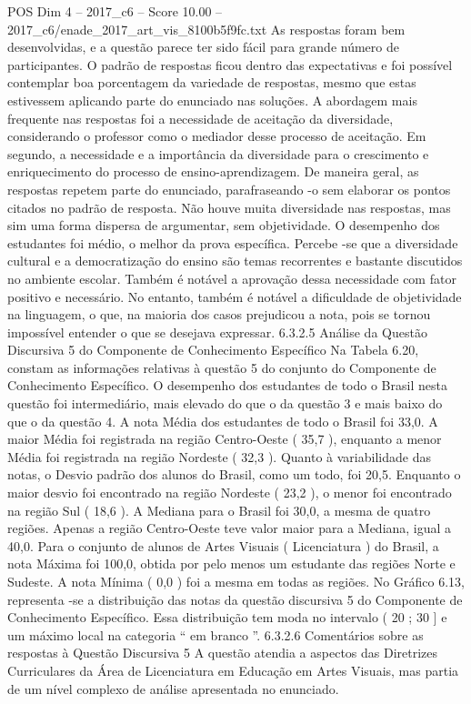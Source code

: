 \begin{textsample}{POS Dim 4 – 2017\_c6 – Score 10.00 – 2017\_c6/enade\_2017\_art\_vis\_8100b5f9fc.txt}
As respostas foram bem desenvolvidas, e a questão parece ter sido fácil para grande número de participantes.
O padrão de respostas ficou dentro das expectativas e foi possível contemplar boa porcentagem da variedade de respostas, mesmo que estas estivessem aplicando parte do enunciado nas soluções.
A abordagem mais frequente nas respostas foi a necessidade de aceitação da diversidade, considerando o professor como o mediador desse processo de aceitação.
Em segundo, a necessidade e a importância da diversidade para o crescimento e enriquecimento do processo de ensino-aprendizagem.
De maneira geral, as respostas repetem parte do enunciado, parafraseando -o sem elaborar os pontos citados no padrão de resposta.
Não houve muita diversidade nas respostas, mas sim uma forma dispersa de argumentar, sem objetividade.
O desempenho dos estudantes foi médio, o melhor da prova específica.
Percebe -se que a diversidade cultural e a democratização do ensino são temas recorrentes e bastante discutidos no ambiente escolar.
Também é notável a aprovação dessa necessidade com fator positivo e necessário.
No entanto, também é notável a dificuldade de objetividade na linguagem, o que, na maioria dos casos prejudicou a nota, pois se tornou impossível entender o que se desejava expressar. 6.3.2.5 Análise da Questão Discursiva 5 do Componente de Conhecimento Específico Na Tabela 6.20, constam as informações relativas à questão 5 do conjunto do Componente de Conhecimento Específico.
O desempenho dos estudantes de todo o Brasil nesta questão foi intermediário, mais elevado do que o da questão 3 e mais baixo do que o da questão 4.
A nota Média dos estudantes de todo o Brasil foi 33,0.
A maior Média foi registrada na região Centro-Oeste ( 35,7 ), enquanto a menor Média foi registrada na região Nordeste ( 32,3 ).
Quanto à variabilidade das notas, o Desvio padrão dos alunos do Brasil, como um todo, foi 20,5.
Enquanto o maior desvio foi encontrado na região Nordeste ( 23,2 ), o menor foi encontrado na região Sul ( 18,6 ).
A Mediana para o Brasil foi 30,0, a mesma de quatro regiões.
Apenas a região Centro-Oeste teve valor maior para a Mediana, igual a 40,0.
Para o conjunto de alunos de Artes Visuais ( Licenciatura ) do Brasil, a nota Máxima foi 100,0, obtida por pelo menos um estudante das regiões Norte e Sudeste.
A nota Mínima ( 0,0 ) foi a mesma em todas as regiões.
No Gráfico 6.13, representa -se a distribuição das notas da questão discursiva 5 do Componente de Conhecimento Específico.
Essa distribuição tem moda no intervalo ( 20 ; 30 ] e um máximo local na categoria “ em branco ”. 6.3.2.6 Comentários sobre as respostas à Questão Discursiva 5 A questão atendia a aspectos das Diretrizes Curriculares da Área de Licenciatura em Educação em Artes Visuais, mas partia de um nível complexo de análise apresentada no enunciado.

\end{textsample}
